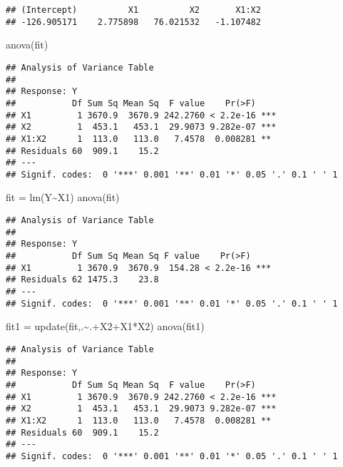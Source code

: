 \documentclass[
]{article}
\newenvironment{Shaded}{\begin{snugshade}}{\end{snugshade}}
\newcommand{\FunctionTok}[1]{\textcolor[rgb]{0.00,0.00,0.00}{#1}}
\newcommand{\NormalTok}[1]{#1}
\newcommand{\OtherTok}[1]{\textcolor[rgb]{0.56,0.35,0.01}{#1}}
\newcommand{\SpecialCharTok}[1]{\textcolor[rgb]{0.00,0.00,0.00}{#1}}
\begin{document}
\begin{verbatim}
## (Intercept)          X1          X2       X1:X2 
## -126.905171    2.775898   76.021532   -1.107482
\end{verbatim}

\begin{Shaded}
\begin{Highlighting}[]
\FunctionTok{anova}\NormalTok{(fit)}
\end{Highlighting}
\end{Shaded}

\begin{verbatim}
## Analysis of Variance Table
## 
## Response: Y
##           Df Sum Sq Mean Sq  F value    Pr(>F)    
## X1         1 3670.9  3670.9 242.2760 < 2.2e-16 ***
## X2         1  453.1   453.1  29.9073 9.282e-07 ***
## X1:X2      1  113.0   113.0   7.4578  0.008281 ** 
## Residuals 60  909.1    15.2                       
## ---
## Signif. codes:  0 '***' 0.001 '**' 0.01 '*' 0.05 '.' 0.1 ' ' 1
\end{verbatim}

\begin{Shaded}
\begin{Highlighting}[]
\NormalTok{fit }\OtherTok{=} \FunctionTok{lm}\NormalTok{(Y}\SpecialCharTok{\textasciitilde{}}\NormalTok{X1)}
\FunctionTok{anova}\NormalTok{(fit)}
\end{Highlighting}
\end{Shaded}

\begin{verbatim}
## Analysis of Variance Table
## 
## Response: Y
##           Df Sum Sq Mean Sq F value    Pr(>F)    
## X1         1 3670.9  3670.9  154.28 < 2.2e-16 ***
## Residuals 62 1475.3    23.8                      
## ---
## Signif. codes:  0 '***' 0.001 '**' 0.01 '*' 0.05 '.' 0.1 ' ' 1
\end{verbatim}

\begin{Shaded}
\begin{Highlighting}[]
\NormalTok{fit1 }\OtherTok{=} \FunctionTok{update}\NormalTok{(fit,.}\SpecialCharTok{\textasciitilde{}}\NormalTok{.}\SpecialCharTok{+}\NormalTok{X2}\SpecialCharTok{+}\NormalTok{X1}\SpecialCharTok{*}\NormalTok{X2)}
\FunctionTok{anova}\NormalTok{(fit1)}
\end{Highlighting}
\end{Shaded}

\begin{verbatim}
## Analysis of Variance Table
## 
## Response: Y
##           Df Sum Sq Mean Sq  F value    Pr(>F)    
## X1         1 3670.9  3670.9 242.2760 < 2.2e-16 ***
## X2         1  453.1   453.1  29.9073 9.282e-07 ***
## X1:X2      1  113.0   113.0   7.4578  0.008281 ** 
## Residuals 60  909.1    15.2                       
## ---
## Signif. codes:  0 '***' 0.001 '**' 0.01 '*' 0.05 '.' 0.1 ' ' 1
\end{verbatim}
\end{document}
